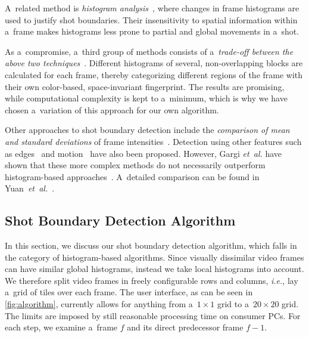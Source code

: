 A~related method is
\emph{histogram analysis}~\cite{otoole1999shotboundary},
where changes in frame histograms are used
to justify shot boundaries.
Their insensitivity to spatial information
within a~frame makes histograms less prone to partial
and global movements in a~shot.

As a~compromise, a~third group of methods consists of
a~\emph{trade-off between the above two
techniques}~\cite{ahmed1999keyframe}.
Different histograms of several, non-overlapping blocks
are calculated for each frame,
thereby categorizing different regions of the frame
with their own color-based, space-invariant fingerprint.
The results are promising, while computational complexity
is kept to a~minimum, which is why we have chosen
a~variation of this approach for our own algorithm.

Other approaches to shot boundary detection include
the \emph{comparison of mean and standard deviations}
of frame intensities~\cite{lienhart1999comparison}.
Detection using other features such as
edges~\cite{zabih1995scenebreaks} and
motion~\cite{bouthemy1997shotchange} have also been proposed.
However, Gargi \emph{et~al.} have shown that
these more complex methods do not necessarily
outperform histogram-based approaches~\cite{gargi2000videoshot}.
A~detailed comparison can be found in
Yuan~\emph{et~al.}~\cite{yuan2007shotboundary}.

\subsection{Shot Boundary Detection Algorithm}
\label{sec:details-of-algo}

In this section, we discuss our shot boundary detection algorithm,
which falls in the category of histogram-based algorithms.
Since visually dissimilar video frames
can have similar global histograms,
instead we take local histograms into account. 
We therefore split video frames in freely configurable
rows and columns, \emph{i.e.}, lay a~grid of tiles over each frame.
The user interface, as can be seen in \autoref{fig:algorithm},
currently allows for anything from a~$\mathit{1} \times \mathit{1}$ 
grid to a~$\mathit{20} \times \mathit{20}$ grid.
The limits are imposed by still reasonable processing time on consumer PCs.
For each step, we examine a~frame $\mathit{f}$ and its direct
predecessor frame $\mathit{f - 1}$.

